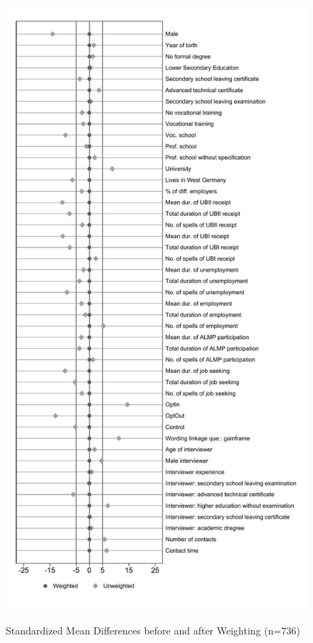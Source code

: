 \newpage
\begin{figure}[b]
\caption{Standardized Mean Differences before and after Weighting (n=736)}
\centering
\includegraphics[scale=0.4]{balance.pdf}
\label{fig:balance}
\end{figure}

